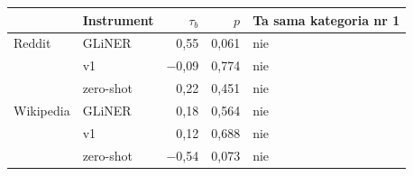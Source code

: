 \begin{tabular}{llrrl}
\toprule
 & Instrument & $\tau_b$ & $p$ & Ta sama kategoria nr 1 \\
\midrule
Reddit & GLiNER & 0{,}55 & 0{,}061 & nie \\
 & v1 & $-$0{,}09 & 0{,}774 & nie \\
 & zero-shot & 0{,}22 & 0{,}451 & nie \\
\midrule
Wikipedia & GLiNER & 0{,}18 & 0{,}564 & nie \\
 & v1 & 0{,}12 & 0{,}688 & nie \\
 & zero-shot & $-$0{,}54 & 0{,}073 & nie \\
\bottomrule
\end{tabular}
